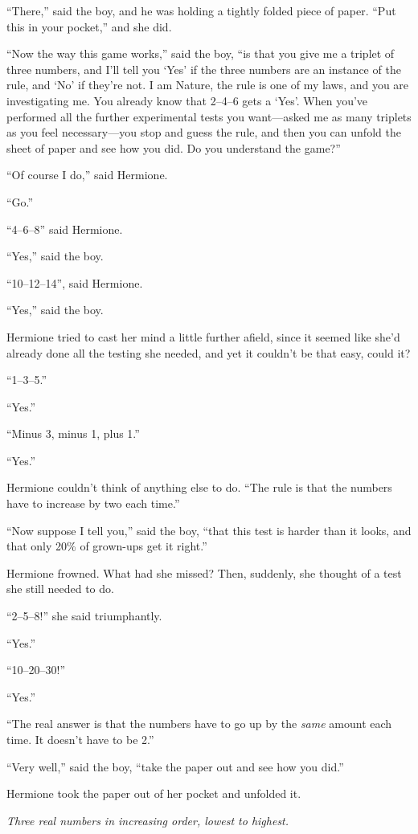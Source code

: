 “There,” said the boy, and he was holding a tightly folded piece of paper. “Put this in your pocket,” and she did.

“Now the way this game works,” said the boy, “is that you give me a triplet of three numbers, and I’ll tell you ‘Yes’ if the three numbers are an instance of the rule, and ‘No’ if they’re not. I am Nature, the rule is one of my laws, and you are investigating me. You already know that 2–4–6 gets a ‘Yes’. When you’ve performed all the further experimental tests you want—asked me as many triplets as you feel necessary—you stop and guess the rule, and then you can unfold the sheet of paper and see how you did. Do you understand the game?”

“Of course I do,” said Hermione.

“Go.”

“4–6–8” said Hermione.

“Yes,” said the boy.

“10–12–14”, said Hermione.

“Yes,” said the boy.

Hermione tried to cast her mind a little further afield, since it seemed like she’d already done all the testing she needed, and yet it couldn’t be that easy, could it?

“1–3–5.”

“Yes.”

“Minus 3, minus 1, plus 1.”

“Yes.”

Hermione couldn’t think of anything else to do. “The rule is that the numbers have to increase by two each time.”

“Now suppose I tell you,” said the boy, “that this test is harder than it looks, and that only 20\% of grown-ups get it right.”

Hermione frowned. What had she missed? Then, suddenly, she thought of a test she still needed to do.

“2–5–8!” she said triumphantly.

“Yes.”

“10–20–30!”

“Yes.”

“The real answer is that the numbers have to go up by the \emph{same} amount each time. It doesn’t have to be 2.”

“Very well,” said the boy, “take the paper out and see how you did.”

Hermione took the paper out of her pocket and unfolded it.

\emph{Three real numbers in increasing order, lowest to highest.}

